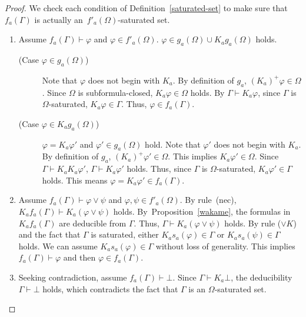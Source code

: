 \begin{proof}
 We check each condition of Definition~\ref{saturated-set} to make sure
 that $f_a(\Gamma)$ is
 actually an~$f'_a(\Omega)$-saturated set.
\begin{enumerate}
 \item Assume $f_a(\Gamma)\vdash\varphi$ and $\varphi\in f'_a(\Omega)$.
       $\varphi\in g_a(\Omega)\cup K_ag_a(\Omega)$ holds.
       \begin{description}
	\item[ (Case $\varphi\in g_a(\Omega)$)]
		   Note that $\varphi$ does not begin with $K_a$.
		   By definition of $g_a$,
		   $(K_a)^+\varphi\in\Omega$.
		   Since $\Omega$ is subformula-closed,
		   $K_a\varphi\in\Omega$ holds.
		   By $\Gamma\vdash K_a\varphi$, since $\Gamma$ is $\Omega$-saturated,
		   $K_a\varphi\in \Gamma$.
		   Thus, $\varphi\in f_a(\Gamma)$.
	\item[ (Case $\varphi\in K_ag_a(\Omega)$)]
		   $\varphi = K_a\varphi'$ and $\varphi'\in g_a(\Omega)$ hold.
		   Note that $\varphi'$ does not begin with $K_a$.
		   By definition of $g_a$,
		   $(K_a)^+\varphi'\in\Omega$.
		   This implies $K_a\varphi'\in\Omega$.
		   Since $\Gamma\vdash K_aK_a\varphi'$,
		   $\Gamma\vdash K_a\varphi'$ holds.
		   Thus, since $\Gamma$ is $\Omega$-saturated,
		   $K_a\varphi'\in \Gamma$ holds.
		   This means $\varphi = K_a\varphi' \in f_a(\Gamma)$.
       \end{description}
 \item Assume $f_a(\Gamma)\vdash\varphi\vee\psi$ and
       $\varphi,\psi\in f'_a(\Omega)$.
       By rule~(nec), $K_af_a(\Gamma)\vdash K_a(\varphi\vee\psi)$ holds.
       By~Proposition~\ref{wakame},
       the formulas in $K_af_a(\Gamma)$ are deducible from $\Gamma$.
       Thus, $\Gamma\vdash K_a(\varphi\vee\psi)$ holds.
       By rule ($\vee K$) and the fact that $\Gamma$ is saturated,
       either $K_as_a(\varphi)\in\Gamma$ or $K_as_a(\psi)\in\Gamma$ holds.
       We can assume $K_as_a(\varphi)\in\Gamma$ without loss of generality.
       This implies $f_a(\Gamma)\vdash\varphi$ and then
       $\varphi\in f_a(\Gamma)$.
 \item Seeking contradiction, assume $f_a(\Gamma)\vdash\bot$.
       Since $\Gamma\vdash K_a\bot$, the deducibility
       $\Gamma\vdash\bot$ holds, which contradicts the fact that
       $\Gamma$ is an $\Omega$-saturated set.
\end{enumerate}
\end{proof}

\newcommand{\natpls}{{\mathbb N}^{+}}

